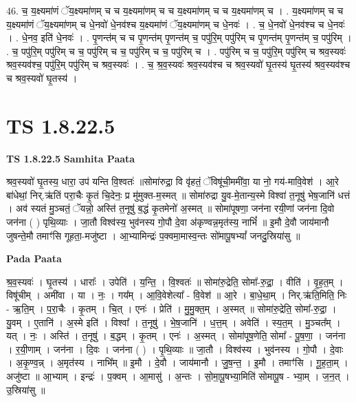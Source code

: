 \documentclass[17pt]{extarticle}
\begin{document}
46. च॒ य॒क्ष्यमा॑णं ॅय॒क्ष्यमा॑णम् च च य॒क्ष्यमा॑णम् च च य॒क्ष्यमा॑णम् च च य॒क्ष्यमा॑णम् च । . य॒क्ष्यमा॑णम् च च य॒क्ष्यमा॑णं ॅय॒क्ष्यमा॑णम् च धे॒नवो॑ धे॒नव॑श्च य॒क्ष्यमा॑णं ॅय॒क्ष्यमा॑णम् च धे॒नवः॑ । . च॒ धे॒नवो॑ धे॒नव॑श्च च धे॒नवः॑ । . धे॒नव॒ इति॑ धे॒नवः॑ । . पृ॒णन्त॑म् च च पृ॒णन्त॑म् पृ॒णन्त॑म् च॒ पपु॑रि॒म् पपु॑रिम् च पृ॒णन्त॑म् पृ॒णन्त॑म् च॒ पपु॑रिम् । . च॒ पपु॑रि॒म् पपु॑रिम् च च॒ पपु॑रिम् च च॒ पपु॑रिम् च च॒ पपु॑रिम् च । . पपु॑रिम् च च॒ पपु॑रि॒म् पपु॑रिम् च श्रव॒स्यवः॑ श्रव॒स्यव॑श्च॒ पपु॑रि॒म् पपु॑रिम् च श्रव॒स्यवः॑ । . च॒ श्र॒व॒स्यवः॑ श्रव॒स्यव॑श्च च श्रव॒स्यवो॑ घृ॒तस्य॑ घृ॒तस्य॑ श्रव॒स्यव॑श्च च श्रव॒स्यवो॑ घृ॒तस्य॑ । \newline
\pagebreak
{}

\section{ TS 1.8.22.5 }

\textbf{TS 1.8.22.5 } \newline
\textbf{Samhita Paata} \newline

श्रव॒स्यवो॑ घृ॒तस्य॒ धारा॒ उप॑ यन्ति वि॒श्वतः॑ ॥सोमा॑रुद्रा॒ वि वृ॑हतं॒ ॅविषू॑ची॒ममी॑वा॒ या नो॒ गय॑-मावि॒वेश॑ । आ॒रे बा॑धेथां॒ निर्.ऋ॑तिं परा॒चैः कृ॒तं चि॒देनः॒ प्र मु॑मुक्त-म॒स्मत् ॥ सोमा॑रुद्रा यु॒व-मे॒तान्य॒स्मे विश्वा॑ त॒नूषु॑ भेष॒जानि॑ धत्तं । अव॑ स्यतं मु॒ञ्चतं॒ ॅयन्नो॒ अस्ति॑ त॒नूषु॑ ब॒द्धं कृ॒तमेनो॑ अ॒स्मत् ॥ सोमा॑पूषणा॒ जन॑ना रयी॒णां जन॑ना दि॒वो जन॑ना ( ) पृथि॒व्याः । जा॒तौ विश्व॑स्य॒ भुव॑नस्य गो॒पौ दे॒वा अ॑कृण्वन्न॒मृत॑स्य॒ नाभिं᳚ ॥ इ॒मौ दे॒वौ जाय॑मानौ जुषन्ते॒मौ तमाꣳ॑सि गूहता॒-मजु॑ष्टा । आ॒भ्यामिन्द्रः॑ प॒क्वमा॒मास्व॒न्तः सो॑मापू॒षभ्यां᳚ जनदु॒स्रिया॑सु ॥ \newline

\textbf{Pada Paata} \newline

श्र॒व॒स्यवः॑ । घृ॒तस्य॑ । धाराः᳚ । उपेति॑ । य॒न्ति॒ । वि॒श्वतः॑ ॥ सोमा॑रु॒द्रेति॒ सोमा᳚-रु॒द्रा॒ । वीति॑ । वृ॒ह॒त॒म् । विषू॑चीम् । अमी॑वा । या । नः॒ । गय᳚म् । आ॒वि॒वेशेत्या᳚ - वि॒वेश॑ ॥ आ॒रे । बा॒धे॒था॒म् । निर्.ऋ॑ति॒मिति॒ निः - ऋ॒ति॒म् । प॒रा॒चैः । कृ॒तम् । चि॒त् । एनः॑ । प्रेति॑ । मु॒मु॒क्त॒म् । अ॒स्मत् ॥ सोमा॑रु॒द्रेति॒ सोमा᳚-रु॒द्रा॒ । यु॒वम् । ए॒तानि॑ । अ॒स्मे इति॑ । विश्वा᳚ । त॒नूषु॑ । भे॒ष॒जानि॑ । ध॒त्त॒म् । अवेति॑ । स्य॒त॒म् । मु॒ञ्चत᳚म् । यत् । नः॒ । अस्ति॑ । त॒नूषु॑ । ब॒द्धम् । कृ॒तम् । एनः॑ । अ॒स्मत् । सोमा॑पूष॒णेति॒ सोमा᳚ - पू॒ष॒णा॒ । जन॑ना । र॒यी॒णाम् । जन॑ना । दि॒वः । जन॑ना ( ) । पृ॒थि॒व्याः ॥ जा॒तौ । विश्व॑स्य । भुव॑नस्य । गो॒पौ । दे॒वाः । अ॒कृ॒ण्व॒न्न् । अ॒मृत॑स्य । नाभि᳚म् ॥ इ॒मौ । दे॒वौ । जाय॑मानौ । जु॒ष॒न्त॒ । इ॒मौ । तमाꣳ॑सि । गू॒ह॒ता॒म् । अजु॑ष्टा ॥ आ॒भ्याम् । इन्द्रः॑ । प॒क्वम् । आ॒मासु॑ । अ॒न्तः । सो॒मा॒पू॒षभ्या॒मिति॑ सोमापू॒ष - भ्या॒म् । ज॒न॒त् । उ॒स्रिया॑सु ॥  \newline
\end{document}

